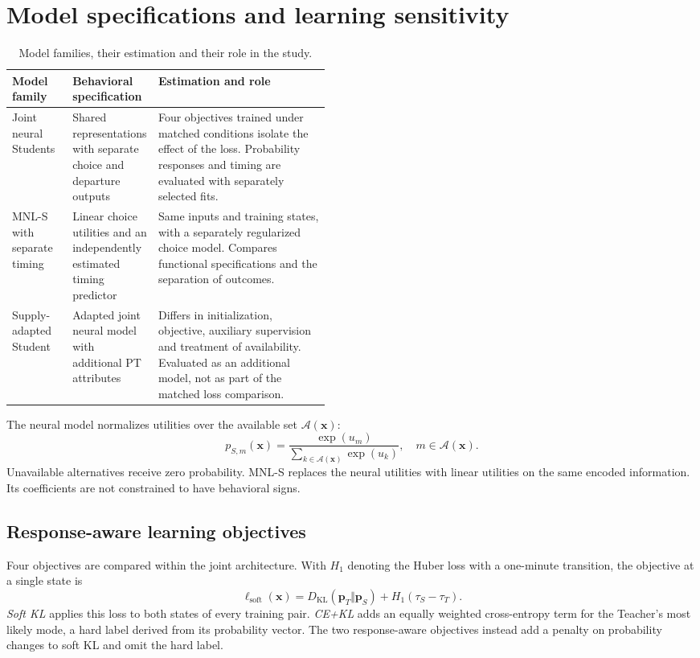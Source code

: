 \section{Model specifications and learning sensitivity}
\label{sec:model_details}
\begin{table}[pos=htbp]
\centering\small
\caption{Model families, their estimation and their role in the study.}
\label{tab:model_roles}
\renewcommand{\arraystretch}{1.13}
\begin{tabularx}{\linewidth}{@{}>{\raggedright\arraybackslash}p{0.19\linewidth}>{\raggedright\arraybackslash}p{0.27\linewidth}>{\raggedright\arraybackslash}X@{}}
\toprule
Model family & Behavioral specification & Estimation and role \\
\midrule
Joint neural Students & Shared representations with separate choice and departure outputs & Four objectives trained under matched conditions isolate the effect of the loss. Probability responses and timing are evaluated with separately selected fits. \\
MNL-S with separate timing & Linear choice utilities and an independently estimated timing predictor & Same inputs and training states, with a separately regularized choice model. Compares functional specifications and the separation of outcomes. \\
Supply-adapted Student & Adapted joint neural model with additional PT attributes & Differs in initialization, objective, auxiliary supervision and treatment of availability. Evaluated as an additional model, not as part of the matched loss comparison. \\
\bottomrule
\end{tabularx}
\end{table}
The neural model normalizes utilities over the available set $\mathcal A(\mathbf x)$:
\begin{equation}
p_{S,m}(\mathbf x)=\frac{\exp(u_m)}{\sum_{k\in\mathcal A(\mathbf x)}\exp(u_k)},\quad m\in\mathcal A(\mathbf x).
\label{eq:utility}
\end{equation}
Unavailable alternatives receive zero probability. MNL-S replaces the neural utilities with linear utilities on the same encoded information. Its coefficients are not constrained to have behavioral signs.
\subsection{Response-aware learning objectives}
\label{sec:loss_details}
Four objectives are compared within the joint architecture. With $H_1$ denoting the Huber loss with a one-minute transition, the objective at a single state is
\begin{equation}
\ell_{\mathrm{soft}}(\mathbf x)=D_{\mathrm{KL}}(\mathbf p_T\Vert\mathbf p_S)+H_1(\tau_S-\tau_T).
\label{eq:state}
\end{equation}
\emph{Soft KL} applies this loss to both states of every training pair. \emph{CE+KL} adds an equally weighted cross-entropy term for the Teacher's most likely mode, a hard label derived from its probability vector. The two response-aware objectives instead add a penalty on probability changes to soft KL and omit the hard label.

